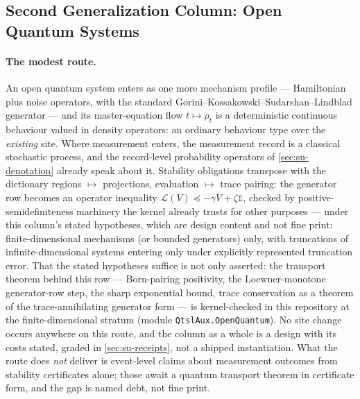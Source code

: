 \subsection{Second Generalization Column: Open Quantum Systems}

\paragraph{The modest route.} An open quantum system enters as one more mechanism
profile --- Hamiltonian plus noise operators, with the standard
Gorini--Kossakowski--Sudarshan--Lindblad generator --- and its
master-equation flow $t \mapsto \rho_t$ is a deterministic continuous
behaviour valued in density operators: an ordinary behaviour type
over the \emph{existing} site. Where measurement enters, the
measurement record is a classical stochastic process, and the
record-level probability operators of
\autoref{sec:su-denotation} already speak about it. Stability
obligations transpose with the dictionary regions $\mapsto$
projections, evaluation $\mapsto$ trace pairing: the generator row becomes
an operator inequality $\mathcal{L}(V) \preceq -\gamma V +
\zeta\mathds{1}$, checked by positive-semidefiniteness machinery
the kernel already trusts for other purposes --- under this column's
stated hypotheses, which are design content and not fine print:
finite-dimensional mechanisms (or bounded generators) only, with
truncations of infinite-dimensional systems entering only under
explicitly represented truncation error. That the stated hypotheses
suffice is
not only asserted: the transport theorem behind this row ---
Born-pairing positivity, the Loewner-monotone generator-row step, the
sharp exponential bound, trace conservation as a theorem of the
trace-annihilating generator form --- is kernel-checked in this
repository at the finite-dimensional stratum (module
\texttt{QtslAux.OpenQuantum}). No site change occurs anywhere on this
route, and the column as a whole is a design with its costs
stated, graded in
\autoref{sec:su-receipts}, not a shipped instantiation. What the
route does \emph{not} deliver is
event-level claims about measurement outcomes from stability
certificates alone; those await a quantum transport theorem in
certificate form, and the gap is named debt, not fine print.

